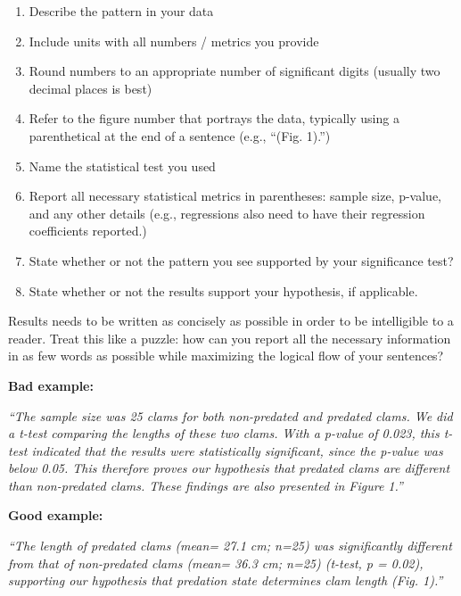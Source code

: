 \documentclass[
]{book}
\providecommand{\tightlist}{%
  \setlength{\itemsep}{0pt}\setlength{\parskip}{0pt}}
\begin{document}
\begin{enumerate}
\def\labelenumi{\arabic{enumi}.}
\tightlist
\item
  Describe the pattern in your data\\
\item
  Include units with all numbers / metrics you provide\\
\item
  Round numbers to an appropriate number of significant digits (usually two decimal places is best)\\
\item
  Refer to the figure number that portrays the data, typically using a parenthetical at the end of a sentence (e.g., ``(Fig. 1).'')\\
\item
  Name the statistical test you used\\
\item
  Report all necessary statistical metrics in parentheses: sample size, p-value, and any other details (e.g., regressions also need to have their regression coefficients reported.)\\
\item
  State whether or not the pattern you see supported by your significance test?
\item
  State whether or not the results support your hypothesis, if applicable.
\end{enumerate}

Results needs to be written as concisely as possible in order to be intelligible to a reader. Treat this like a puzzle: how can you report all the necessary information in as few words as possible while maximizing the logical flow of your sentences?

\textbf{Bad example:}

\emph{``The sample size was 25 clams for both non-predated and predated clams. We did a t-test comparing the lengths of these two clams. With a p-value of 0.023, this t-test indicated that the results were statistically significant, since the p-value was below 0.05. This therefore proves our hypothesis that predated clams are different than non-predated clams. These findings are also presented in Figure 1.''}

\textbf{Good example:}

\emph{``The length of predated clams (mean= 27.1 cm; n=25) was significantly different from that of non-predated clams (mean= 36.3 cm; n=25) (t-test, p = 0.02), supporting our hypothesis that predation state determines clam length (Fig. 1).''}
\end{document}
